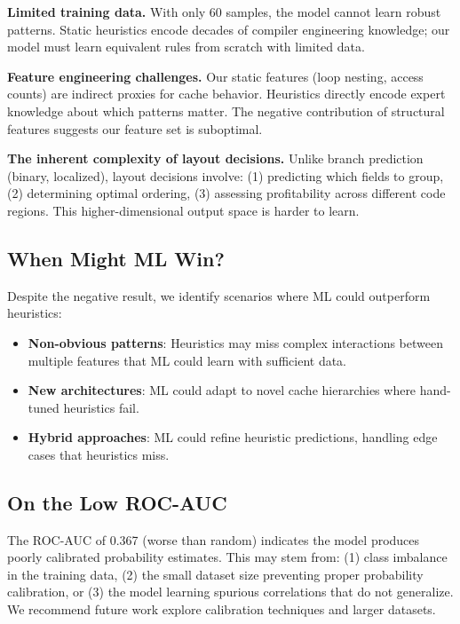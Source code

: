 \documentclass{article}
\begin{document}
\textbf{Limited training data.} With only 60 samples, the model cannot learn robust patterns. Static heuristics encode decades of compiler engineering knowledge; our model must learn equivalent rules from scratch with limited data.

\textbf{Feature engineering challenges.} Our static features (loop nesting, access counts) are indirect proxies for cache behavior. Heuristics directly encode expert knowledge about which patterns matter. The negative contribution of structural features suggests our feature set is suboptimal.

\textbf{The inherent complexity of layout decisions.} Unlike branch prediction (binary, localized), layout decisions involve: (1) predicting which fields to group, (2) determining optimal ordering, (3) assessing profitability across different code regions. This higher-dimensional output space is harder to learn.

\subsection{When Might ML Win?}

Despite the negative result, we identify scenarios where ML could outperform heuristics:
\begin{itemize}
    \item \textbf{Non-obvious patterns}: Heuristics may miss complex interactions between multiple features that ML could learn with sufficient data.
    \item \textbf{New architectures}: ML could adapt to novel cache hierarchies where hand-tuned heuristics fail.
    \item \textbf{Hybrid approaches}: ML could refine heuristic predictions, handling edge cases that heuristics miss.
\end{itemize}

\subsection{On the Low ROC-AUC}

The ROC-AUC of 0.367 (worse than random) indicates the model produces poorly calibrated probability estimates. This may stem from: (1) class imbalance in the training data, (2) the small dataset size preventing proper probability calibration, or (3) the model learning spurious correlations that do not generalize. We recommend future work explore calibration techniques and larger datasets.
\end{document}
